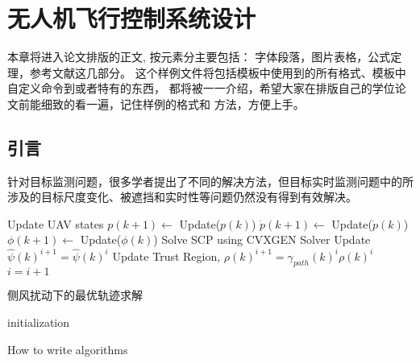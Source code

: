 \chapter{无人机飞行控制系统设计}
\label{chap:main}
本章将进入论文排版的正文, 按元素分主要包括：
{\kai 字体段落，图片表格，公式定理，参考文献}这几部分。
这个样例文件将包括模板中使用到的所有格式、模板中自定义命令到或者特有的东西，
都将被一一介绍，希望大家在排版自己的学位论文前能细致的看一遍，记住样例的格式和
方法，方便上手。
\cite{ELIDRISSI94}

\section{引言}
针对目标监测问题，很多学者提出了不同的解决方法，但目标实时监测问题中的所涉及的目标尺度变化、被遮挡和实时性等问题仍然没有得到有效解决。

 
\begin{algorithm2e}
	\SetAlgoLined
 	
	{
		Update UAV states \;
		$p(k+1) \leftarrow$ Update($p(k)$)\;
		$\dot{p}(k+1) \leftarrow$ Update($\dot{p}(k)$)\;
		${\phi}(k+1) \leftarrow$ Update(${\phi}(k)$)\;
		Solve SCP using CVXGEN Solver\;
		Update $\hat{\psi}(k)^{i+1} = \hat{\psi}(k)^{i} $\;
		Update Trust Region, $\rho(k)^{i+1} = \gamma_{path}(k)^{i} \rho(k)^{i}$ \;
		$i = i + 1$
	}
	\caption{侧风扰动下的最优轨迹求解}
\end{algorithm2e}

\begin{algorithm2e}[H]
	\SetAlgoLined
	initialization\;
	\caption{How to write algorithms}
\end{algorithm2e}

